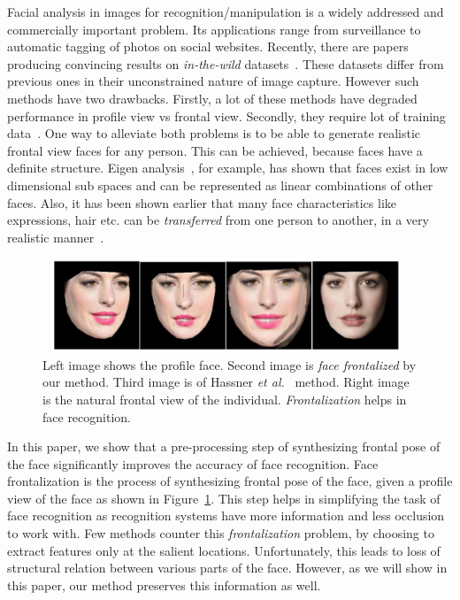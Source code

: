 Facial analysis in images for recognition/manipulation is a widely addressed and commercially important problem. 
Its applications range from surveillance to automatic tagging of photos on social websites. 
Recently, there are papers producing convincing results on {\em in-the-wild}
datasets~\cite{Ramanan:2012:FDP:2354409.2355119,DBLP:journals/corr/HassnerHPE14}. These
datasets differ from previous ones in their unconstrained nature of image capture.
However such methods have two drawbacks. Firstly, a lot of these methods have degraded performance in profile view vs frontal view. 
Secondly, they require lot of training data~\cite{HuLT14}. One way to alleviate both problems is to be able 
to generate realistic frontal view faces for any person. This can be achieved, because faces have a definite 
structure. Eigen analysis~\cite{Belhumeur:1997:EVF:261506.261512}, for example, has shown that faces exist in low dimensional sub spaces and can be represented as linear combinations of other faces. Also, it has been shown earlier that many face characteristics like expressions, hair etc. can be \emph{transferred} from one person to another, in a very realistic manner~\cite{conf/fgr/SaragihLC11a}.

\begin{figure}
\begin{center}\includegraphics[width=11.0cm,height=2.8cm]{front/figures/sample_result_f.png}\end{center}
\caption{Left image shows the profile face. Second image is {\em face frontalized} by our method. Third image is of Hassner {\em et al.}~\cite{DBLP:journals/corr/HassnerHPE14} method. Right image is the natural frontal view of the individual. {\em Frontalization} helps in face recognition. }
\label{fig:sample_result}
\end{figure}

In this paper, we show that a pre-processing step of synthesizing frontal pose of the face
significantly improves the accuracy of face recognition. Face frontalization is the process of
synthesizing frontal pose of the face, given a profile view of the face as shown in
Figure~\ref{fig:sample_result}. This step helps in simplifying the task of face recognition as
recognition systems have more information and less occlusion to work with. Few methods counter this
{\em frontalization} problem, by choosing to extract features only at the salient locations.
Unfortunately, this leads to loss of structural relation between various parts of the face. However,
as we will show in this paper, our method preserves this information as well. 

